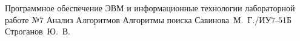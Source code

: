 \documentclass{bmstu}
\begin{document}
	
	{Программное обеспечение ЭВМ и информационные технологии}
	{лабораторной работе №7}
	{Анализ Алгоритмов}
	{Алгоритмы поиска}
	{}
	{Савинова~М.~Г./ИУ7-51Б}
	{Строганов~Ю.~В.}
	
	\maketableofcontents
	
	
	
	
	
	
	
	
	\makebibliography
	
\end{document}
